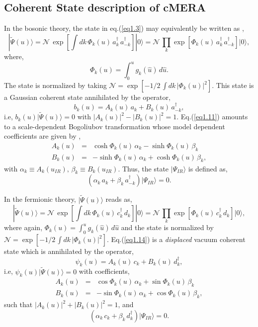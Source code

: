 \documentclass[preprint,aps]{revtex4}
\def\barray{\begin{eqnarray}}
\def\earray{\end{eqnarray}}
\def\beq{\begin{equation}}
\def\eeq{\end{equation}}
\begin{document}
\subsection*{Coherent State description of cMERA}
In the bosonic theory, the state in eq.(\ref{eq1.3}) may equivalently be written as \cite{taka1},
\beq
\label{eq1.10}
|\widetilde{\Psi}(u)\rangle =  \mathcal{N}\, \exp\left[ \int dk\, \Phi_k(u)\,a^{\dagger}_k\, a^{\dagger}_{-k}\right] |0\rangle = \mathcal{N}\, \prod_{k} \exp\left[\Phi_k(u)\, a^{\dagger}_k\, a^{\dagger}_{-k}\right] |0\rangle,
\eeq
where,
\beq
\label{eq1.10i}
\Phi_k(u) = \int_{0}^{u}  g_k(\hat{u})\, d\hat{u}.
\eeq   
The state is normalized by taking $\mathcal{N}=\exp\left[-1/2\, \int dk\, |\Phi_k(u)|^2 \right]$. This state is a Gaussian coherent state annihilated by the operator,
\beq
\label{eq1.11}
b_k(u)=A_k(u)\, a_k + B_k(u)\,  a^{\dagger}_{-k},
\eeq
i.e, $b_k(u)|\widetilde{\Psi}(u)\rangle = 0$ with $|A_k(u)|^2-|B_k(u)|^2=1$. Eq.(\ref{eq1.11}) amounts to a scale-dependent Bogoliubov transformation whose model dependent coefficients are given by \cite{cMERA},
\barray
\label{eq1.12}
A_k(u)& = &\cosh \Phi_k(u)\, \alpha_k -\sinh \Phi_k(u)\, \beta_k \\\nonumber
B_k(u)& = &-\sinh \Phi_k(u)\, \alpha_k +\cosh \Phi_k(u)\, \beta_k,
\earray
with $\alpha_k \equiv A_k(u_{IR}),\, \beta_k \equiv B_k(u_{IR})$. Thus, the state $|\Psi_{IR}\rangle$ is defined as,
\beq
\label{eq1.13}
(\alpha_k\, a_k +\beta_k\, a^{\dagger}_{-k})|\Psi_{IR}\rangle=0.
\eeq

In the fermionic theory, $|\widetilde{\Psi}(u)\rangle$ reads as,
\beq
\label{eq1.14}
|\widetilde{\Psi}(u)\rangle =  \mathcal{N}\, \exp\left[ \int dk\, \Phi_k(u)\,c^{\dagger}_k\, d_{k}\right] |0\rangle =  \mathcal{N}\, \prod_{k} \exp\left[\Phi_k(u)\, c^{\dagger}_k\, d_{k}\right] |0\rangle,
\eeq
where again, $\Phi_k(u) = \int_{0}^{u}  g_k(\hat{u})\, d\hat{u}$ and the state is normalized by $\mathcal{N}=\exp\left[-1/2\, \int dk\, |\Phi_k(u)|^2 \right]$. Eq.(\ref{eq1.14}) is a \textit{displaced} vacuum coherent state which is annihilated by the operator,
\beq
\label{eq1.15}
\psi_k(u)=A_k(u)\, c_k + B_k(u)\,  d^{\dagger}_{k},
\eeq
i.e, $\psi_k(u)|\widetilde{\Psi}(u)\rangle = 0$ with coefficients,
\barray
\label{eq1.16}
A_k(u)& = &\cos \Phi_k(u)\, \alpha_k + \sin \Phi_k(u)\, \beta_k \\\nonumber
B_k(u)& = &-\sin \Phi_k(u)\, \alpha_k +\cos \Phi_k(u)\, \beta_k,
\earray
such that $|A_k(u)|^2+|B_k(u)|^2=1$, and
\beq
\label{eq1.17}
(\alpha_k\, c_k +\beta_k\, d^{\dagger}_{k})|\Psi_{IR}\rangle=0.
\eeq
\end{document}
